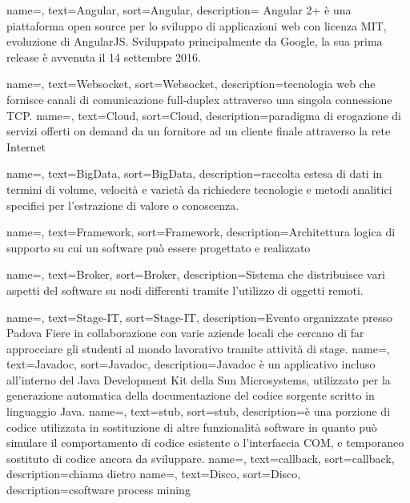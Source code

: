 {
    name=,
    text=Angular,
    sort=Angular,
    description={ Angular 2+ è una piattaforma open source per lo sviluppo di applicazioni web con licenza MIT, evoluzione di AngularJS. Sviluppato principalmente da Google, la sua prima release è avvenuta il 14 settembre 2016.}
}

{
    name=,
    text=Websocket,
    sort=Websocket,
    description={tecnologia web che fornisce canali di comunicazione full-duplex attraverso una singola connessione TCP.}
}
{
    name=,
    text=Cloud,
    sort=Cloud,
    description={paradigma di erogazione di servizi offerti on demand da un fornitore ad un cliente finale attraverso la rete Internet}
}

{
    name=,
    text=BigData,
    sort=BigData,
    description={raccolta estesa di dati in termini di volume, velocità e varietà da richiedere tecnologie e metodi analitici specifici per l'estrazione di valore o conoscenza.}
}

{
    name=,
    text=Framework,
    sort=Framework,
    description={Architettura logica di supporto su cui un software può essere progettato e realizzato}
}

{
    name=,
    text=Broker,
    sort=Broker,
    description={Sistema che distribuisce vari aspetti del software su nodi differenti tramite l'utilizzo di oggetti remoti.}
}

{
    name=,
    text=Stage-IT,
    sort=Stage-IT,
    description={Evento organizzate presso Padova Fiere in collaborazione con varie aziende locali che cercano di far approcciare gli studenti al mondo lavorativo tramite attività di stage.}
}
{
    name=,
    text=Javadoc,
    sort=Javadoc,
    description={Javadoc è un applicativo incluso all'interno del Java Development Kit della Sun Microsystems, utilizzato per la generazione automatica della documentazione del codice sorgente scritto in linguaggio Java.}
}
{
    name=,
    text=stub,
    sort=stub,
    description={è una porzione di codice utilizzata in sostituzione di altre funzionalità software in quanto può simulare il comportamento di codice esistente o l'interfaccia COM, e temporaneo sostituto di codice ancora da sviluppare.}
}
{
    name=,
    text=callback,
    sort=callback,
    description={chiama dietro}
}
{
    name=,
    text=Disco,
    sort=Disco,
    description={csoftware process mining}
}